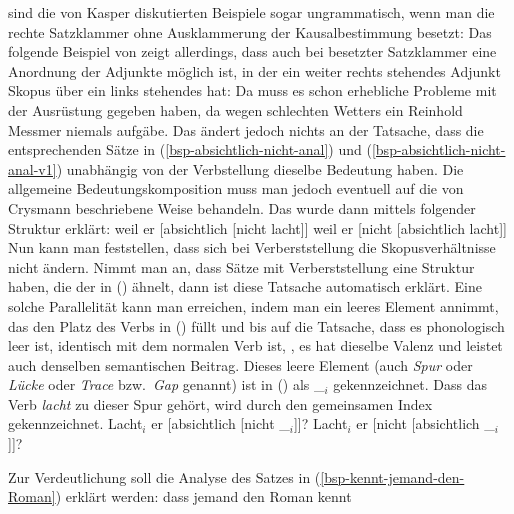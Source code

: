\begin{enumerate}
{  sind die von Kasper diskutierten Beispiele sogar ungrammatisch,
  wenn man die rechte Satzklammer ohne Ausklammerung der Kausalbestimmung besetzt:
\eal
{}
\zl
  Das folgende Beispiel von \citet[]{Crysmann2004a}
  zeigt allerdings, dass auch bei besetzter Satzklammer eine Anordnung der Adjunkte
  möglich ist, in der ein weiter rechts stehendes Adjunkt Skopus über ein links stehendes hat:
\ea
Da muss es schon erhebliche Probleme mit der Ausrüstung gegeben haben, da wegen schlechten
  Wetters ein Reinhold Messmer niemals aufgäbe.
\z
Das ändert jedoch nichts an der Tatsache, dass die entsprechenden
Sätze in (\ref{bsp-absichtlich-nicht-anal}) und (\ref{bsp-absichtlich-nicht-anal-v1}) unabhängig von der Verbstellung
dieselbe Bedeutung haben. Die allgemeine Bedeutungskomposition muss man jedoch eventuell
auf die von Crysmann beschriebene Weise behandeln.%
}
Das wurde dann mittels folgender Struktur erklärt:
\eal
\label{bsp-absichtlich-nicht-anal}
\ex weil er [absichtlich [nicht lacht]]
\ex weil er [nicht [absichtlich lacht]]
\zl
Nun kann man feststellen, dass sich bei Verberststellung die Skopusverhältnisse nicht ändern.
Nimmt man an, dass Sätze mit Verberststellung eine Struktur haben, die der in ()
ähnelt, dann ist diese Tatsache automatisch erklärt. Eine solche Parallelität kann man
erreichen, indem man ein leeres Element annimmt, das den Platz des Verbs in () füllt
und bis auf die Tatsache, dass es phonologisch leer ist, identisch
mit dem normalen Verb ist, \dash, es hat dieselbe Valenz und leistet auch denselben semantischen
Beitrag. Dieses leere Element (auch \emph{Spur} oder \emph{Lücke}
oder \emph{Trace} bzw.\ \emph{Gap} genannt)
ist in () als \_$_i$ gekennzeichnet. 
Dass das Verb \emph{lacht} zu dieser Spur gehört, wird durch den gemeinsamen
Index gekennzeichnet.
\eal
\label{bsp-absichtlich-nicht-anal-v1}
\ex Lacht$_i$ er [absichtlich [nicht \_$_i$]]?
\ex Lacht$_i$ er [nicht [absichtlich \_$_i$]]?
\zl{}
\nocite{Hoehle88a,Hoehle97a}
\end{enumerate}
Zur Verdeutlichung soll die Analyse des Satzes in (\ref{bsp-kennt-jemand-den-Roman}) erklärt werden:
\eal
\ex dass jemand den Roman kennt\label{bsp-dass-jemand-den-Roman-kennt}

